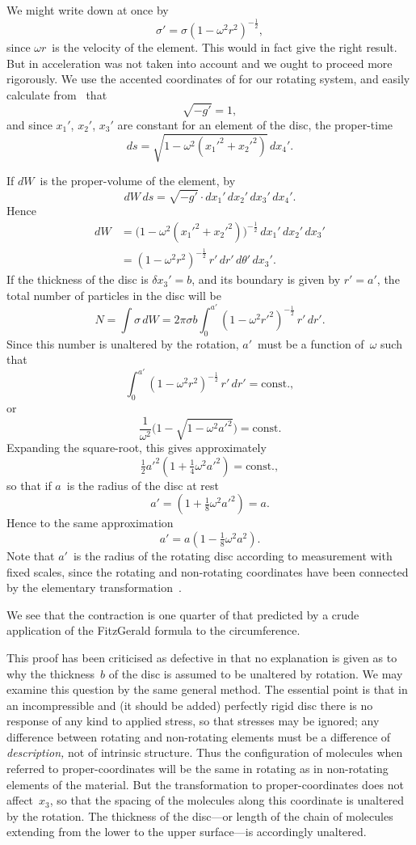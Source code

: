 \documentclass[12pt]{book}
\begin{document}
We might write down at once by~
\[
\sigma' = \sigma (1 - \omega^2 r^{2})^{-\frac{1}{2}},
\]
since $\omega r$~is the velocity of the element. This would in fact give the right
result. But in  acceleration was not taken into account and we ought to
proceed more rigorously. We use the accented coordinates of  for our
rotating system, and easily calculate from~ that
\[
\sqrt{-g'} = 1,
\]
and since $x_{1}'$, $x_{2}'$, $x_{3}'$ are constant for an element of the disc, the proper\hyp{}time
\[
ds = \sqrt{1 - \omega^2(x_{1}'^{2} + x_{2}'^{2})}\, dx_{4}'.
\]

If $dW$~is the proper\hyp{}volume of the element, by~
\[
dW\, ds = \sqrt{-g'} \cdot dx_{1}'\, dx_{2}'\, dx_{3}'\, dx_{4}'.
\]
Hence
\begin{align*}
  dW &= \bigl(1 - \omega^2(x_{1}'^{2} + x_{2}'^{2})\bigr)^{-\frac{1}{2}}\, dx_{1}'\, dx_{2}'\, dx_{3}' \\
  &= (1 - \omega^2 r^{2})^{-\frac{1}{2}}\, r'\, dr'\, d\theta'\, dx_{3}'.
\end{align*}
If the thickness of the disc is $\delta x_{3}' = b$, and its boundary is given by $r' = a'$,
the total number of particles in the disc will be
\[
N = \int \sigma\, dW
= 2\pi\sigma b \int_{0}^{a'} (1 - \omega^2 r'^{2})^{-\frac{1}{2}}\, r'\, dr'.
\]
Since this number is unaltered by the rotation, $a'$~must be a function of~$\omega$
such that
\[
\int_{0}^{a'} (1 - \omega^2 r^{2})^{-\frac{1}{2}}\, r'\, dr' = \text{const.},
\]
or
\[
\frac{1}{\omega^2}\bigl(1 - \sqrt{1 - \omega^2 a'^{2}}\bigr) = \text{const.}
\]
Expanding the square\hyp{}root, this gives approximately
\[
\tfrac{1}{2} a'^{2} (1 + \tfrac{1}{4} \omega^2 a'^{2}) = \text{const.},
\]
so that if $a$~is the radius of the disc at rest
\[
a' = (1 + \tfrac{1}{8} \omega^2 a'^{2}) = a.
\]
Hence to the same approximation
\[
a' = a (1 - \tfrac{1}{8} \omega^2 a^2).
\]
Note that $a'$~is the radius of the rotating disc according to measurement with
fixed scales, since the rotating and non\hyp{}rotating coordinates have been connected
by the elementary transformation~.

We see that the contraction is one quarter of that predicted by a crude
application of the FitzGerald formula to the circumference.

This proof has been criticised as defective in that no explanation is given as to why the thickness~$b$ of the disc
is assumed to be unaltered by rotation.
We may examine this question by the same general method.
The essential point is that in an incompressible and (it should be added) perfectly rigid disc there is no response
of any kind to applied stress, so that stresses may be ignored;
any difference between rotating and non\hyp{}rotating elements must be a difference of \emph{description,} not of
intrinsic structure.
Thus the configuration of molecules when referred to proper\hyp{}coordinates will be the same in rotating as in
non\hyp{}rotating elements of the material.
But the transformation to proper\hyp{}coordinates does not affect~$x_3$, so that the spacing of the molecules along this
coordinate is unaltered by the rotation.
The thickness of the disc---or length of the chain of molecules extending from the lower to the
upper surface---is accordingly unaltered.
\end{document}
